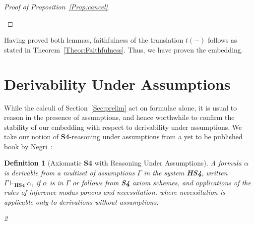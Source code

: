 \documentclass[a4paper]{article}
\newtheorem{definition}[theorem]{Definition}
\newcommand{\SFour}{\textbf{S4}\xspace}
\begin{document}
\begin{proof}[Proof of Proposition~\ref{Prop:cancel}]
\begin{description}
    \end{description}

    
\end{proof}

Having proved both lemmas, faithfulness of the translation $t(-)$ follows as stated in Theorem~\ref{Theor:Faithfulness}. Thus, we have proven the embedding.


\section{Derivability Under Assumptions}
\label{Sec:Assumptions}

While the calculi of Section~\ref{Sec:prelim} act on formulae alone,
it is usual to reason in the presence of assumptions,
and hence worthwhile to confirm the stability of our embedding with respect to derivability under assumptions.
We take our notion of \SFour-reasoning under assumptions from a yet to be published book by Negri~\cite{SaraNegriNewBook}:

\begin{definition}[Axiomatic \SFour with Reasoning Under Assumptions] A formula $\alpha$ is derivable from a multiset of assumptions $\Gamma$ in the system \textbf{HS4}, written $\Gamma \vdash_{\textbf{HS4}} \alpha$, if $\alpha$ is in $\Gamma$ or follows from \SFour axiom schemes, and applications of the rules of inference \textit{modus ponens} and \textit{necessitation}, where necessitation is applicable only to derivations without assumptions:
\begin{enumerate}
\begin{multicols}{2}

\item \AxiomC{$\alpha \in \Gamma $}
\UnaryInfC{$\Gamma \vdash \alpha$}

\DisplayProof

\vspace{0.5em}
\item {}
\UnaryInfC{$\Gamma \vdash \alpha$}

\DisplayProof

\item \AxiomC{$\Gamma \vdash \alpha$}
\AxiomC{$\Delta \vdash \alpha \rightarrow \beta$}

\BinaryInfC{$\Gamma, \Delta \vdash \beta$}

\DisplayProof

\vspace{0.5em}
\item \AxiomC{$\vdash \alpha$}
\UnaryInfC{$\Gamma \vdash \Box \alpha$}

\DisplayProof


\end{multicols}

\end{enumerate}
    
\end{definition}
\end{document}
